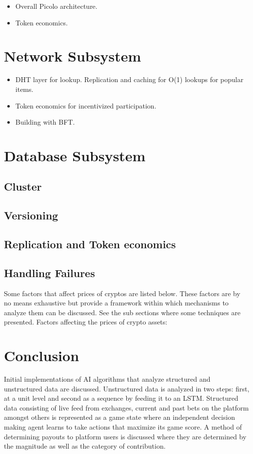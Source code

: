 \documentclass[a4paper]{article}
\begin{document}
    \begin{itemize}
        \item Overall Picolo architecture.
        \item Token economics.
    \end{itemize}
\section{Network Subsystem}

    \begin{itemize}
        \item DHT layer for lookup. Replication and caching for O(1) lookups for popular items.
        \item Token economics for incentivized participation.
        \item Building with BFT.
    \end{itemize}
\section{Database Subsystem}

\subsection{Cluster}
\subsection{Versioning}
\subsection{Replication and Token economics}
\subsection{Handling Failures}

Some factors that affect prices of cryptos are listed below. These factors are by no means exhaustive but provide a framework within which mechanisms to analyze them can be discussed. See the sub sections where some techniques are presented.
Factors affecting the prices of crypto assets:

\section{Conclusion}
Initial implementations of AI algorithms that analyze structured and unstructured data are discussed. Unstructured data is analyzed in two steps: first, at a unit level and second as a sequence by feeding it to an LSTM. Structured data consisting of live feed from exchanges, current and past bets on the platform amongst others is represented as a game state where an independent decision making agent learns to take actions that maximize its game score. A method of determining payouts to platform users is discussed where they are determined by the magnitude as well as the category of contribution.




\end{document}
